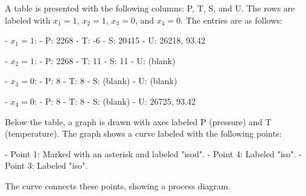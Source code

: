 A table is presented with the following columns: P, T, S, and U. The rows are labeled with \( x_1 = 1 \), \( x_2 = 1 \), \( x_3 = 0 \), and \( x_4 = 0 \). The entries are as follows:  

- \( x_1 = 1 \):  
  - P: 2268  
  - T: -6  
  - S: 20415  
  - U: 26218, 93.42  

- \( x_2 = 1 \):  
  - P: 2268  
  - T: 11  
  - S: 11  
  - U: (blank)  

- \( x_3 = 0 \):  
  - P: 8  
  - T: 8  
  - S: (blank)  
  - U: (blank)  

- \( x_4 = 0 \):  
  - P: 8  
  - T: 8  
  - S: (blank)  
  - U: 26725, 93.42  

Below the table, a graph is drawn with axes labeled P (pressure) and T (temperature). The graph shows a curve labeled with the following points:  

- Point 1: Marked with an asterisk and labeled "isod".  
- Point 4: Labeled "iso".  
- Point 3: Labeled "iso".  

The curve connects these points, showing a process diagram.